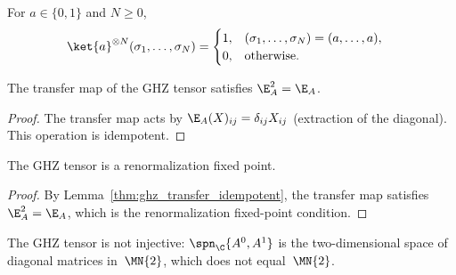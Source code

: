 \begin{definition}\label{def:constant_ket}
    \leanok
    For $a\in\{0,1\}$ and $N\ge0$,
    \begin{align}
        \ket{a}^{\otimes N}(\sigma_1,\ldots,\sigma_N)
         & =
        \begin{cases}
            1, & (\sigma_1,\ldots,\sigma_N)=(a,\ldots,a), \\
            0, & \text{otherwise}.
        \end{cases}
        \notag
    \end{align}
\end{definition}

\begin{lemma}\label{thm:ghz_transfer_idempotent}
    \leanok
    The transfer map of the GHZ tensor satisfies $\E_A^2 = \E_A$.
\end{lemma}

\begin{proof}
    \leanok
    The transfer map acts by $\E_A(X)_{ij} = \delta_{ij} X_{ij}$
    (extraction of the diagonal). This operation is idempotent.
\end{proof}

\begin{lemma}\label{thm:ghz_is_rfp}
    \leanok
    The GHZ tensor is a renormalization fixed point.
\end{lemma}

\begin{proof}
    \leanok
    By Lemma~\ref{thm:ghz_transfer_idempotent}, the transfer map satisfies
    $\E_A^2=\E_A$, which is the renormalization fixed-point condition.
\end{proof}

\begin{lemma}\label{thm:ghz_not_injective}
    \leanok
    The GHZ tensor is not injective: $\spn_{\C}\{A^0, A^1\}$ is the
    two-dimensional space of diagonal matrices in~$\MN{2}$, which does
    not equal~$\MN{2}$.
\end{lemma}

